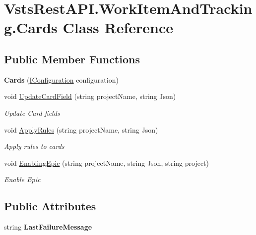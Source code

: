 \hypertarget{class_vsts_rest_a_p_i_1_1_work_item_and_tracking_1_1_cards}{}\section{Vsts\+Rest\+A\+P\+I.\+Work\+Item\+And\+Tracking.\+Cards Class Reference}
\label{class_vsts_rest_a_p_i_1_1_work_item_and_tracking_1_1_cards}
\subsection*{Public Member Functions}
\begin{DoxyCompactItemize}
\item 
\mbox{\label{class_vsts_rest_a_p_i_1_1_work_item_and_tracking_1_1_cards_af4078fdba1a2c2b138e1302b31794f4d}} 
{\bfseries Cards} (\mbox{\hyperlink{interface_vsts_rest_a_p_i_1_1_i_configuration}{I\+Configuration}} configuration)
\item 
void \mbox{\hyperlink{class_vsts_rest_a_p_i_1_1_work_item_and_tracking_1_1_cards_aef506846ff57c971ab48a51a39f8cea4}{Update\+Card\+Field}} (string project\+Name, string Json)
\begin{DoxyCompactList}\small\item\em Update Card fields \end{DoxyCompactList}\item 
void \mbox{\hyperlink{class_vsts_rest_a_p_i_1_1_work_item_and_tracking_1_1_cards_a01a9ffa779ba2cdcd5750cc188dc42f1}{Apply\+Rules}} (string project\+Name, string Json)
\begin{DoxyCompactList}\small\item\em Apply rules to cards \end{DoxyCompactList}\item 
void \mbox{\hyperlink{class_vsts_rest_a_p_i_1_1_work_item_and_tracking_1_1_cards_a307fb639df853926ff09dadadfd8aa12}{Enabling\+Epic}} (string project\+Name, string Json, string project)
\begin{DoxyCompactList}\small\item\em Enable Epic \end{DoxyCompactList}\end{DoxyCompactItemize}
\subsection*{Public Attributes}
\begin{DoxyCompactItemize}
\item 
\mbox{\label{class_vsts_rest_a_p_i_1_1_work_item_and_tracking_1_1_cards_ab9717c8763516e21eb0f5623e748394c}} 
string {\bfseries Last\+Failure\+Message}
\end{DoxyCompactItemize}


